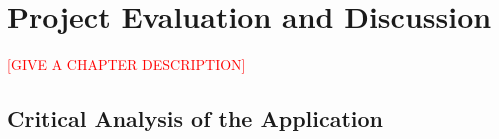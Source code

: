 \def\baselinestretch{1}

\chapter{Project Evaluation and Discussion}
\label{chapter:Evaluation}

\def\baselinestretch{1.66}



\textcolor{red}{[GIVE A CHAPTER DESCRIPTION]}

\goodbreak

 \section{Critical Analysis of the Application}
 \label{sec:CriticalAnalysisOfTheApplication}